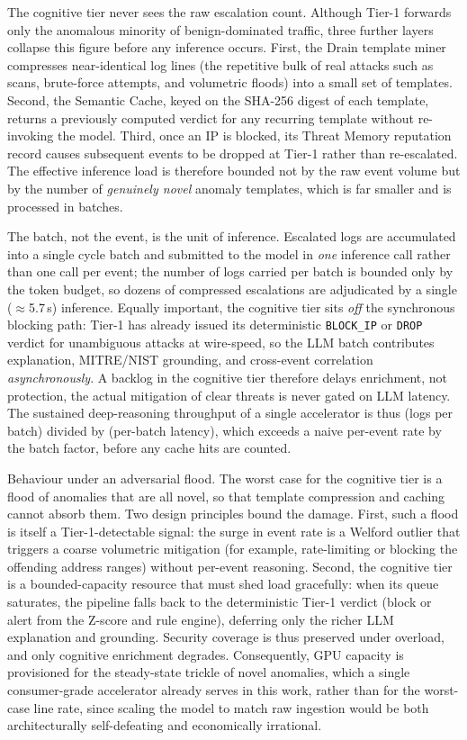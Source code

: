 The cognitive tier never sees the raw escalation count. Although Tier-1 forwards only the anomalous minority of benign-dominated traffic, three further layers collapse this figure before any inference occurs. First, the Drain template miner compresses near-identical log lines (the repetitive bulk of real attacks such as scans, brute-force attempts, and volumetric floods) into a small set of templates. Second, the Semantic Cache, keyed on the SHA-256 digest of each template, returns a previously computed verdict for any recurring template without re-invoking the model. Third, once an IP is blocked, its Threat Memory reputation record causes subsequent events to be dropped at Tier-1 rather than re-escalated. The effective inference load is therefore bounded not by the raw event volume but by the number of \emph{genuinely novel} anomaly templates, which is far smaller and is processed in batches.

The batch, not the event, is the unit of inference. Escalated logs are accumulated into a single cycle batch and submitted to the model in \emph{one} inference call rather than one call per event; the number of logs carried per batch is bounded only by the token budget, so dozens of compressed escalations are adjudicated by a single ($\approx$5.7\,s) inference. Equally important, the cognitive tier sits \emph{off} the synchronous blocking path: Tier-1 has already issued its deterministic \texttt{BLOCK\_IP} or \texttt{DROP} verdict for unambiguous attacks at wire-speed, so the LLM batch contributes explanation, MITRE/NIST grounding, and cross-event correlation \emph{asynchronously}. A backlog in the cognitive tier therefore delays enrichment, not protection, the actual mitigation of clear threats is never gated on LLM latency. The sustained deep-reasoning throughput of a single accelerator is thus (logs per batch) divided by (per-batch latency), which exceeds a naive per-event rate by the batch factor, before any cache hits are counted.

Behaviour under an adversarial flood. The worst case for the cognitive tier is a flood of anomalies that are all novel, so that template compression and caching cannot absorb them. Two design principles bound the damage. First, such a flood is itself a Tier-1-detectable signal: the surge in event rate is a Welford outlier that triggers a coarse volumetric mitigation (for example, rate-limiting or blocking the offending address ranges) without per-event reasoning. Second, the cognitive tier is a bounded-capacity resource that must shed load gracefully: when its queue saturates, the pipeline falls back to the deterministic Tier-1 verdict (block or alert from the Z-score and rule engine), deferring only the richer LLM explanation and grounding. Security coverage is thus preserved under overload, and only cognitive enrichment degrades. Consequently, GPU capacity is provisioned for the steady-state trickle of novel anomalies, which a single consumer-grade accelerator already serves in this work, rather than for the worst-case line rate, since scaling the model to match raw ingestion would be both architecturally self-defeating and economically irrational.

